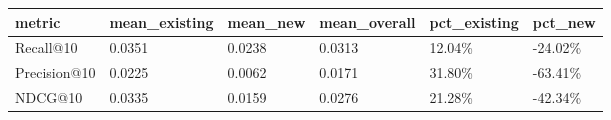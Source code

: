 \begin{tabular}{llllll}
\toprule
metric & mean_existing & mean_new & mean_overall & pct_existing & pct_new \\
\midrule
Recall@10 & 0.0351 & 0.0238 & 0.0313 & 12.04\% & -24.02\% \\
Precision@10 & 0.0225 & 0.0062 & 0.0171 & 31.80\% & -63.41\% \\
NDCG@10 & 0.0335 & 0.0159 & 0.0276 & 21.28\% & -42.34\% \\
\bottomrule
\end{tabular}
